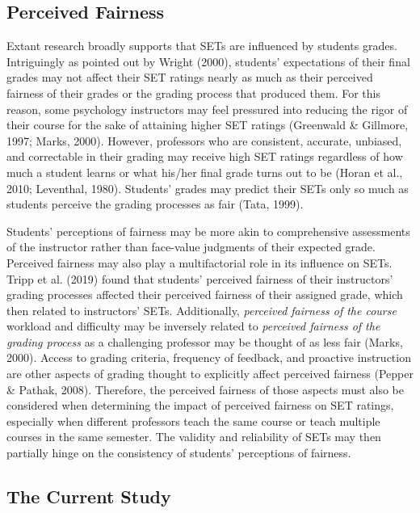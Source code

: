 \documentclass[
  man]{apa7}
\begin{document}
\hypertarget{perceived-fairness}{%
\subsection{Perceived Fairness}\label{perceived-fairness}}

Extant research broadly supports that SETs are influenced by students grades. Intriguingly as pointed out by Wright (2000), students' expectations of their final grades may not affect their SET ratings nearly as much as their perceived fairness of their grades or the grading process that produced them. For this reason, some psychology instructors may feel pressured into reducing the rigor of their course for the sake of attaining higher SET ratings (Greenwald \& Gillmore, 1997; Marks, 2000). However, professors who are consistent, accurate, unbiased, and correctable in their grading may receive high SET ratings regardless of how much a student learns or what his/her final grade turns out to be (Horan et al., 2010; Leventhal, 1980). Students' grades may predict their SETs only so much as students perceive the grading processes as fair (Tata, 1999).

Students' perceptions of fairness may be more akin to comprehensive assessments of the instructor rather than face-value judgments of their expected grade. Perceived fairness may also play a multifactorial role in its influence on SETs. Tripp et al. (2019) found that students' perceived fairness of their instructors' grading processes affected their perceived fairness of their assigned grade, which then related to instructors' SETs. Additionally, \emph{perceived fairness of the course} workload and difficulty may be inversely related to \emph{perceived fairness of the grading process} as a challenging professor may be thought of as less fair (Marks, 2000). Access to grading criteria, frequency of feedback, and proactive instruction are other aspects of grading thought to explicitly affect perceived fairness (Pepper \& Pathak, 2008). Therefore, the perceived fairness of those aspects must also be considered when determining the impact of perceived fairness on SET ratings, especially when different professors teach the same course or teach multiple courses in the same semester. The validity and reliability of SETs may then partially hinge on the consistency of students' perceptions of fairness.

\hypertarget{the-current-study}{%
\subsection{The Current Study}\label{the-current-study}}
\end{document}

